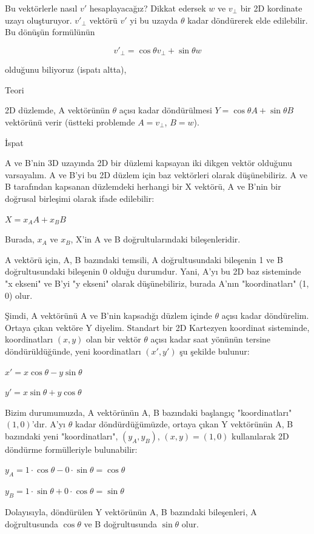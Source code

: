 \documentclass[12pt,fleqn]{article}\usepackage{../../common}
\begin{document}
Bu vektörlerle nasıl $v'$ hesaplayacağız? Dikkat edersek $w$ ve $v_\perp$ bir 2D
kordinate uzayı oluşturuyor. $v'_\perp$ vektörü $v'$ yi bu uzayda $\theta$ kadar
döndürerek elde edilebilir. Bu dönüşün formülünün

$$
v'_\perp = \cos \theta v_\perp + \sin \theta w
$$

olduğunu biliyoruz (ispatı altta),

Teori

2D düzlemde, A vektörünün $\theta$ açısı kadar döndürülmesi $Y = \cos \theta A +
\sin \theta B$ vektörünü verir (üstteki problemde $A = v_\perp$, $B = w$).

İspat

A ve B'nin 3D uzayında 2D bir düzlemi kapsayan iki dikgen vektör olduğunu
varsayalım. A ve B'yi bu 2D düzlem için baz vektörleri olarak düşünebiliriz. A
ve B tarafından kapsanan düzlemdeki herhangi bir X vektörü, A ve B'nin bir
doğrusal birleşimi olarak ifade edilebilir:

$X = x_A A + x_B B$

Burada, $x_A$ ve $x_B$, X'in A ve B doğrultularındaki bileşenleridir.

A vektörü için, {A, B} bazındaki temsili, A doğrultusundaki bileşenin
1 ve B doğrultusundaki bileşenin 0 olduğu durumdur. Yani, A'yı bu 2D
baz sisteminde "x ekseni" ve B'yi "y ekseni" olarak düşünebiliriz,
burada A'nın "koordinatları" (1, 0) olur.

Şimdi, A vektörünü A ve B'nin kapsadığı düzlem içinde $\theta$ açısı
kadar döndürelim. Ortaya çıkan vektöre Y diyelim. Standart bir 2D
Kartezyen koordinat sisteminde, koordinatları $(x, y)$ olan bir vektör
$\theta$ açısı kadar saat yönünün tersine döndürüldüğünde, yeni
koordinatları $(x', y')$ şu şekilde bulunur:

$x' = x \cos \theta - y \sin \theta$

$y' = x \sin \theta + y \cos \theta$

Bizim durumumuzda, A vektörünün {A, B} bazındaki başlangıç
"koordinatları" $(1, 0)$'dır. A'yı $\theta$ kadar döndürdüğümüzde,
ortaya çıkan Y vektörünün {A, B} bazındaki yeni "koordinatları",
$(y_A, y_B)$, $(x, y) = (1, 0)$ kullanılarak 2D döndürme formülleriyle
bulunabilir:

$y_A = 1 \cdot \cos \theta - 0 \cdot \sin \theta = \cos \theta$

$y_B = 1 \cdot \sin \theta + 0 \cdot \cos \theta = \sin \theta$

Dolayısıyla, döndürülen Y vektörünün {A, B} bazındaki bileşenleri, A
doğrultusunda $\cos \theta$ ve B doğrultusunda $\sin \theta$ olur.
\end{document}
